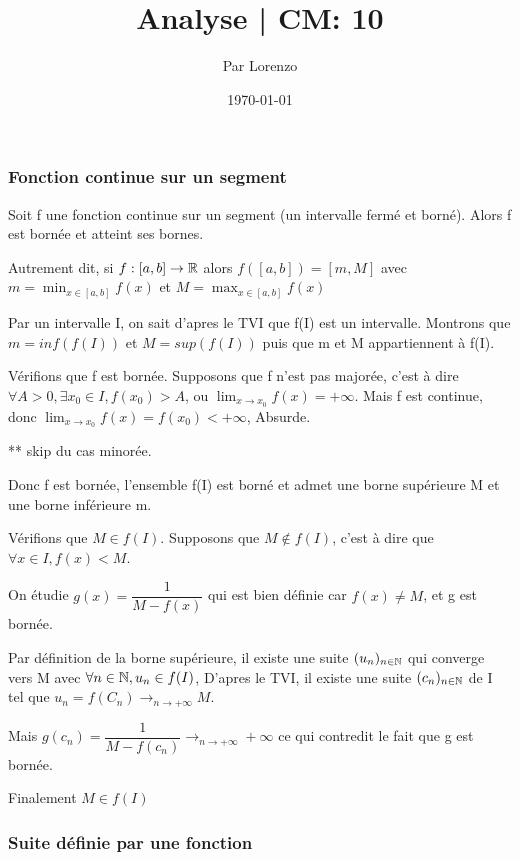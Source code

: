 \documentclass[a4paper, 12pt]{article}
\title{Analyse | CM: 10}
\author{Par Lorenzo}
\date{\today}
\begin{document}
\maketitle

\subsubsection{Fonction continue sur un segment}

\begin{theorem}
    Soit f une fonction continue sur un segment (un intervalle fermé et borné).
    Alors f est bornée et atteint ses bornes.

    Autrement dit, si $f: [a, b] \rightarrow \mathbb{R}$ alors $f([a, b]) = [m, M]$ avec $m = \min_{x \in [a, b]}f(x)$ et $M = \max_{x \in [a, b]}f(x)$
\end{theorem}

\begin{demonstration}
    Par un intervalle I, on sait d'apres le TVI que f(I) est un intervalle. Montrons que $m = inf(f(I))$
    et $M = sup(f(I))$ puis que m et M appartiennent à f(I).

    Vérifions que f est bornée. Supposons que f n'est pas majorée, c'est à dire
    $\forall A \gt 0, \exists x_0 \in I, f(x_0) \gt A$, ou $\lim_{x \to x_0}f(x) = +\infty$.
    Mais f est continue, donc $\lim_{x \to x_0}f(x) = f(x_0) \lt +\infty$, Absurde.

    ** skip du cas minorée.

    Donc f est bornée, l'ensemble f(I) est borné et admet une borne supérieure M et une borne inférieure m.

    Vérifions que $M \in f(I)$. Supposons que $M \notin f(I)$, c'est à dire que $\forall x \in I, f(x) \lt M$.

    On étudie $g(x) = \dfrac{1}{M - f(x)}$ qui est bien définie car $f(x) \neq M$, et g est bornée.

    Par définition de la borne supérieure, il existe une suite $(u_n)_{n \in \mathbb{N}}$ qui converge vers M avec
    $\forall n \in \mathbb{N}, u_n \in f(I)$, D'apres le TVI, il existe une suite $(c_n)_{n \in \mathbb{N}}$ de I tel que $u_n = f(C_n) \rightarrow_{n \to +\infty} M$.

    Mais $g(c_n) = \dfrac{1}{M - f(c_n)} \rightarrow_{n \to +\infty} + \infty$ ce qui contredit le fait que g est bornée.

    Finalement $M \in f(I)$
\end{demonstration}

\subsubsection{Suite définie par une fonction}
\end{document}

